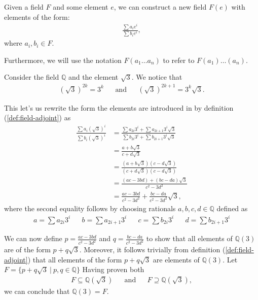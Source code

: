 \begin{defn} \label{def:field-adjoint}
  Given a field $F$ and some element $e$, we can construct a new field $F(e)$ with elements of the form:
\begin{align*}
  \frac{\sum a _i e ^i }{\sum b _i e ^i },
\end{align*}
where $a _i, b _i \in F$.

  Furthermore, we will use the notation $F(a _1 \ldots a _n)$ to refer to $F(a _1) \ldots (a _n)$.
\end{defn}

\newpage
\begin{exmp} \label{exp:q-adjoint-sqrt-3}
  Consider the field $\mathbb Q$  and the element $\sqrt 3$. We notice that 
  \begin{align*}
    {(\sqrt 3)} ^{2k} = 3 ^k && \text{and} && {(\sqrt 3)} ^{2k + 1} = 3 ^k \sqrt 3.
  \end{align*}

  This let's us rewrite the form the elements are introduced in by definition (\ref{def:field-adjoint}) as
  \begin{align*}
    \frac{\sum a _i {(\sqrt 3)} ^i }{\sum b _i {(\sqrt 3)} ^i }
    &= \frac{\sum a _{2i} 3 ^i + \sum a_{2i + 1} 3 ^i \sqrt 3}{\sum b _{2i} 3 ^i + \sum b_{2i + 1} 3 ^i \sqrt 3} 
    \\&= \frac{a + b\sqrt 3}{c + d\sqrt 3}
    \\&= \frac{(a + b \sqrt 3)(c - d \sqrt 3)}{(c + d \sqrt 3)(c - d \sqrt 3)}
    \\&= \frac{(ac - 3bd) + (bc - da) \sqrt 3}{c ^2 - 3 d ^2 }
    \\&= \frac{ac - 3bd}{c ^2 - 3 d ^2 } + \frac{bc - da}{c ^2 - 3 d ^2 } \sqrt 3,
  \end{align*}
  where the second equality follows by choosing rationals $a, b, c, d \in \mathbb{Q}$ defined as
  \begin{align*}
    a = \sum a _{2i} 3 ^i && b = \sum a _{2i + 1} 3 ^i  &&
    c = \sum b _{2i} 3 ^i && d = \sum b _{2i + 1} 3 ^i 
  \end{align*}

  We can now define $p = \frac{ac - 3bd}{c ^2 - 3 d ^2 }$ and $q = \frac{bc - da}{c ^2 - 3 d ^2 }$ to show that all elements of $ \mathbb{Q} (3)$ are of the form $p + q \sqrt 3$. Moreover, it follows trivially from  definition (\ref{def:field-adjoint}) that all elements of the form $p + q \sqrt 3$ are elements of $\mathbb{Q} (3)$. Let $F = \{p + q \sqrt 3 \:|\: p, q \in \mathbb{Q} \}$ Having proven both 
  \begin{align*}
     F \subseteq \mathbb{Q} (\sqrt 3) && \text{and} && F \supseteq \mathbb{Q} (\sqrt 3),
  \end{align*}
 we can conclude that $\mathbb{Q} (3)  = F$.


\end{exmp}
